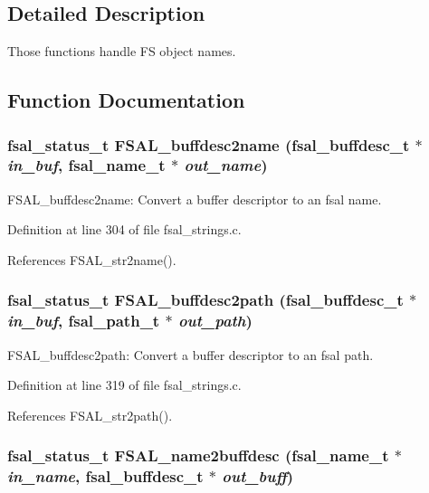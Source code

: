 \subsection{Detailed Description}
Those functions handle FS object names. 

\subsection{Function Documentation}
\subsubsection{\setlength{\rightskip}{0pt plus 5cm}fsal\_\-status\_\-t FSAL\_\-buffdesc2name (fsal\_\-buffdesc\_\-t $\ast$ {\em in\_\-buf}, fsal\_\-name\_\-t $\ast$ {\em out\_\-name})}\label{group__FSALNameFunctions_ga8}


FSAL\_\-buffdesc2name: Convert a buffer descriptor to an fsal name. 

Definition at line 304 of file fsal\_\-strings.c.

References FSAL\_\-str2name().
\subsubsection{\setlength{\rightskip}{0pt plus 5cm}fsal\_\-status\_\-t FSAL\_\-buffdesc2path (fsal\_\-buffdesc\_\-t $\ast$ {\em in\_\-buf}, fsal\_\-path\_\-t $\ast$ {\em out\_\-path})}\label{group__FSALNameFunctions_ga9}


FSAL\_\-buffdesc2path: Convert a buffer descriptor to an fsal path. 

Definition at line 319 of file fsal\_\-strings.c.

References FSAL\_\-str2path().
\subsubsection{\setlength{\rightskip}{0pt plus 5cm}fsal\_\-status\_\-t FSAL\_\-name2buffdesc (fsal\_\-name\_\-t $\ast$ {\em in\_\-name}, fsal\_\-buffdesc\_\-t $\ast$ {\em out\_\-buff})}\label{group__FSALNameFunctions_ga11}


